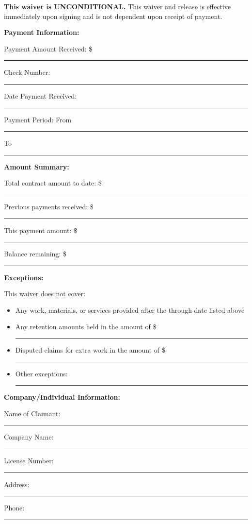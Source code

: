 \documentclass[11pt,letterpaper]{article}
\begin{document}
\textbf{This waiver is UNCONDITIONAL.} This waiver and release is effective immediately upon signing and is not dependent upon receipt of payment.

\vspace{6pt}

\textbf{Payment Information:}

Payment Amount Received: \$ \rule{5cm}{0.4pt}

Check Number: \rule{4cm}{0.4pt}

Date Payment Received: \rule{4cm}{0.4pt}

Payment Period: From \rule{3cm}{0.4pt} To \rule{3cm}{0.4pt}

\vspace{6pt}

\textbf{Amount Summary:}

Total contract amount to date: \$ \rule{5cm}{0.4pt}

Previous payments received: \$ \rule{5cm}{0.4pt}

This payment amount: \$ \rule{5cm}{0.4pt}

Balance remaining: \$ \rule{5cm}{0.4pt}

\vspace{6pt}

\textbf{Exceptions:}

This waiver does not cover:
\begin{itemize}[leftmargin=0.5in]
\item Any work, materials, or services provided after the through-date listed above
\item Any retention amounts held in the amount of \$ \rule{3cm}{0.4pt}
\item Disputed claims for extra work in the amount of \$ \rule{3cm}{0.4pt}
\item Other exceptions: \rule{7cm}{0.4pt}
\end{itemize}

\vspace{12pt}

\textbf{Company/Individual Information:}

Name of Claimant: \rule{8cm}{0.4pt}

Company Name: \rule{8cm}{0.4pt}

License Number: \rule{5cm}{0.4pt}

Address: \rule{10cm}{0.4pt}

Phone: \rule{4cm}{0.4pt}

\vspace{12pt}
\end{document}
